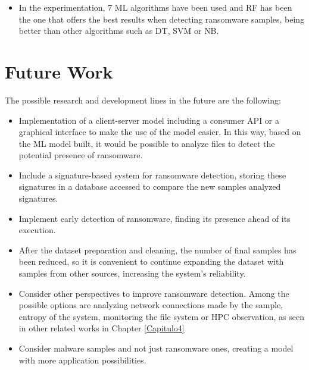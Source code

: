\begin{itemize}
    \item In the experimentation, 7 \gls{ML} algorithms have been used and \gls{RF} has been the one that offers the best results when detecting ransomware samples, being better than other algorithms such as \gls{DT}, \gls{SVM} or \gls{NB}.

\end{itemize}


\section{Future Work}
\noindent The possible research and development lines in the future are the following:

\begin{itemize}
    \item Implementation of a client-server model including a consumer \gls{API} or a graphical interface to make the use of the model easier. In this way, based on the \gls{ML} model built, it would be possible to analyze files to detect the potential presence of ransomware.
    
    \item Include a signature-based system for ransomware detection, storing these signatures in a database accessed to compare the new samples analyzed signatures.
    
    \item Implement early detection of ransomware, finding its presence ahead of its execution.
    
    \item After the dataset preparation and cleaning, the number of final samples has been reduced, so it is convenient to continue expanding the dataset with samples from other sources, increasing the system's reliability.

    \item Consider other perspectives to improve ransomware detection. Among the possible options are analyzing network connections made by the sample, entropy of the system, monitoring the file system or \gls{HPC} observation, as seen in other related works in 
    Chapter \ref{Capitulo4}

    \item Consider malware samples and not just ransomware ones, creating a model with more application possibilities.
    
\end{itemize}